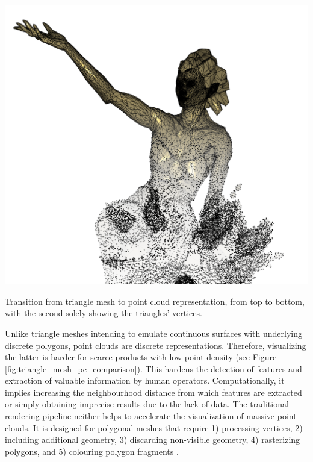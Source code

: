 \begin{marginfigure}[.0cm]
	\includegraphics{figs/fundamentals/triangle_mesh_point_cloud.png}
	\caption{Transition from triangle mesh to point cloud representation, from top to bottom, with the second solely showing the triangles' vertices.}
	\label{fig:triangle_mesh_pc_comparison}
\end{marginfigure}
Unlike triangle meshes intending to emulate continuous surfaces with underlying discrete polygons, point clouds are discrete representations. Therefore, visualizing the latter is harder for scarce products with low point density (see Figure \ref{fig:triangle_mesh_pc_comparison}). This hardens the detection of features and extraction of valuable information by human operators. Computationally, it implies increasing the neighbourhood distance from which features are extracted or simply obtaining imprecise results due to the lack of data. The traditional rendering pipeline neither helps to accelerate the visualization of massive point clouds. It is designed for polygonal meshes that require 1) processing vertices, 2) including additional geometry, 3) discarding non-visible geometry, 4) rasterizing polygons, and 5) colouring polygon fragments \cite{akenine-moller_real-time_2018}.

